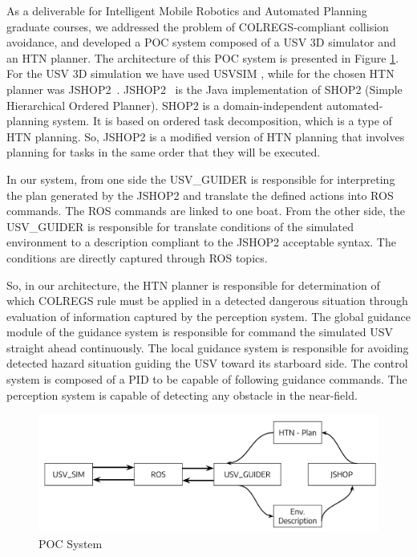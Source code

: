     As a deliverable for Intelligent Mobile Robotics and Automated Planning graduate courses, we addressed the problem of \ac{COLREGS}-compliant collision avoidance, and developed a \ac{POC} system composed of a \ac{USV} 3D simulator and an \ac{HTN} planner. The architecture of this \ac{POC} system is presented in Figure \ref{fig:USVSIM_JSHOP}. For the \ac{USV} 3D simulation we have used USVSIM \cite{Paravisi2018Toward}, while for the chosen \ac{HTN} planner was \ac{JSHOP}2~\cite{Nau2003SHOP2_System}.  \ac{JSHOP}2~\cite{Nau2003SHOP2_System} is the Java implementation of SHOP2 (Simple Hierarchical Ordered Planner). SHOP2 is a domain-independent automated-planning system. It is based on ordered task decomposition, which is a type of \acl{HTN} planning. So, \ac{JSHOP}2 is a modified version of \ac{HTN} planning that involves planning for tasks in the same order that they will be executed.
    
    In our system, from one side the USV\_GUIDER \cite{Darlan2018USV_GUIDER} is responsible for interpreting the plan generated by the \ac{JSHOP}2 and translate the defined actions into \ac{ROS} commands. The \ac{ROS} commands are linked to one boat. From the other side, the USV\_GUIDER is responsible for translate conditions of the simulated environment to a description compliant to the \ac{JSHOP}2 acceptable syntax. The conditions are directly captured through \ac{ROS} topics. 
    
    So, in our architecture, the \ac{HTN} planner is responsible for determination of which \ac{COLREGS} rule must be applied in a detected dangerous situation through evaluation of information captured by the perception system. The global guidance module of the guidance system is responsible for command the simulated \ac{USV} straight ahead continuously. The local guidance system is responsible for avoiding detected hazard situation guiding the \ac{USV} toward its starboard side. The control system is composed of a \ac{PID} to be capable of following guidance commands. The perception system is capable of detecting any obstacle in the near-field.
    
    \begin{figure}[H]
        \centering
        \includegraphics[scale=0.3]{figs/POC_USVSIM_JSHOP2.png}
        \caption{POC System}
        \label{fig:USVSIM_JSHOP}
    \end{figure}
    
